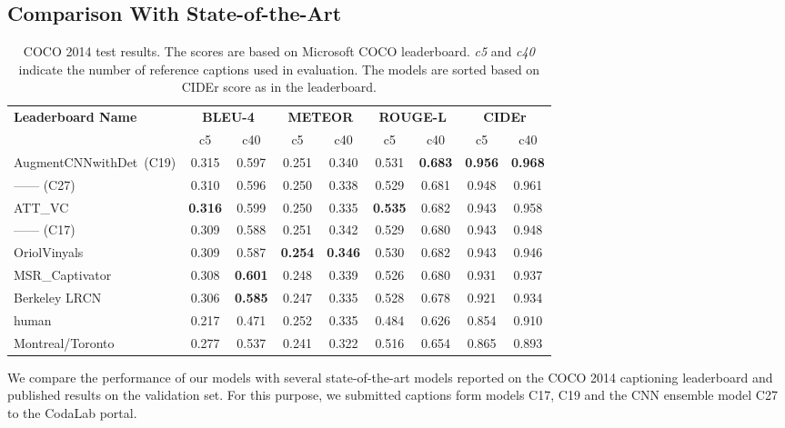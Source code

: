 \subsection{Comparison With State-of-the-Art}
\begin{table}[htp]
  \newcommand{\mct}[1]{%
    \multicolumn{2}{c|}{\bf#1}}
  \centering
  \begin{adjustbox}{center}
  \begin{tabular}{|l|c|c|c|c|c|c|c|c|}
    \hline\hline
    \multirow{2}{*}{\bf Leaderboard Name}
                       &\mct{BLEU-4} &\mct{METEOR} &\mct{ROUGE-L}&\mct{CIDEr}\\\cline{2-9}
                    & c5    & c40   &  c5   & c40   & c5  &  c40  &  c5  &  c40 \\\hline\hline
    AugmentCNNwithDet~(C19)& 0.315 & 0.597 & 0.251 &0.340& 0.531 &\bf0.683&\bf0.956&\bf0.968\\
    ------ (C27) & 0.310 & 0.596 & 0.250 &0.338& 0.529 & 0.681& 0.948& 0.961\\
    ATT\_VC~\cite{you2016image}& \bf0.316&0.599 & 0.250 &0.335&\bf0.535&0.682& 0.943& 0.958\\
    ------ (C17)  &  0.309 & 0.588 & 0.251 &0.342& 0.529 & 0.680& 0.943& 0.948\\
    OriolVinyals~\cite{Vinyals_2015_CVPR}      & 0.309 & 0.587 &\bf0.254&\bf0.346& 0.530 & 0.682& 0.943& 0.946\\
    MSR\_Captivator~\cite{Fang2015}  & 0.308 &\bf0.601& 0.248 &0.339& 0.526 & 0.680& 0.931& 0.937\\
    Berkeley LRCN~\cite{donahue2015long}   & 0.306 &\bf0.585& 0.247 &0.335& 0.528 & 0.678& 0.921& 0.934\\
    human~\cite{Chen2015}   & 0.217 & 0.471 & 0.252 &0.335& 0.484 & 0.626 & 0.854 & 0.910\\
    Montreal/Toronto~\cite{Xu2015show} & 0.277 & 0.537 & 0.241 &0.322& 0.516 & 0.654 & 0.865 & 0.893\\
    \hline \hline
  \end{tabular}
  \end{adjustbox}
  \caption{COCO 2014 test results. The scores are based on Microsoft
          COCO leaderboard. \emph{c5} and \emph{c40} indicate the number
  of reference captions used in evaluation. The models are sorted
  based on CIDEr score as in the leaderboard.}
  \label{tab:resCocLeaderTest}
\end{table}

We compare the performance of our models with several state-of-the-art
models reported on the COCO 2014 captioning leaderboard and published results on
the validation set.
For this purpose, we submitted captions form models C17, C19 and the CNN
ensemble model C27 to the CodaLab portal.

